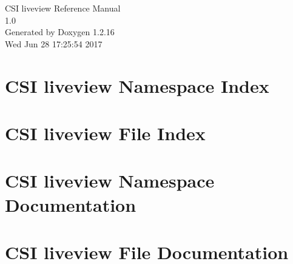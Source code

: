 \documentclass[a4paper]{book}
\begin{document}
\begin{titlepage}
\vspace*{7cm}
\begin{center}
{\Large CSI liveview Reference Manual\\[1ex]\large 1.0}\\
\vspace*{1cm}
{\large Generated by Doxygen 1.2.16}\\
\vspace*{0.5cm}
{\small Wed Jun 28 17:25:54 2017}\\
\end{center}
\end{titlepage}
\clearemptydoublepage
{}
\tableofcontents
\clearemptydoublepage
{}
\chapter{CSI liveview Namespace Index}

\chapter{CSI liveview File Index}

\chapter{CSI liveview Namespace Documentation}






\chapter{CSI liveview File Documentation}








\printindex
\end{document}
